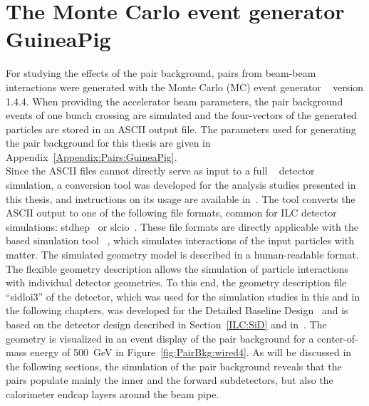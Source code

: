 \section{The Monte Carlo event generator GuineaPig}
\label{PairBkg:GuineaPig}
For studying the effects of the pair background, \positron\electron pairs from beam-beam interactions were generated with the Monte Carlo (MC) event generator \guineapig~\cite{Schulte:1997nga} version 1.4.4. 
When providing the accelerator beam parameters, the pair background events of one bunch crossing are simulated and the four-vectors of the generated particles are stored in an ASCII output file.
The parameters used for generating the pair background for this thesis are given in Appendix~\ref{Appendix:Pairs:GuineaPig}. 
\\Since the ASCII files cannot directly serve as input to a full \geant~\cite{geant_ref,geant_ref2} detector simulation, a conversion tool was developed for the analysis studies presented in this thesis, and instructions on its usage are available in~\cite{Confluence}. 
The tool converts the ASCII output to one of the following file formats, common for ILC detector simulations: stdhep~\cite{stdhep} or slcio~\cite{LCIO}.
These file formats are directly applicable with the \geant based simulation tool \slic~\cite{Graf:2006ei}, which simulates interactions of the input particles with matter.
The simulated geometry model is described in a human-readable format.
The flexible geometry description allows the simulation of particle interactions with individual detector geometries.
To this end, the geometry description file ``sidloi3'' of the \sid detector, which was used for the simulation studies in this and in the following chapters, was developed for the \sid Detailed Baseline Design~\cite[p. 51 ff]{TDR4} and is based on the detector design described in Section~\ref{ILC:SiD} and in~\cite[p. 69 ff]{TDR4}.
The \sid geometry is visualized in an event display of the pair background for a center-of-mass energy of \SI{500}{\GeV} in Figure~\ref{fig:PairBkg:wired4}.
As will be discussed in the following sections, the simulation of the pair background reveals that the pairs populate mainly the inner and the forward \sid subdetectors, but also the calorimeter endcap layers around the beam pipe.
